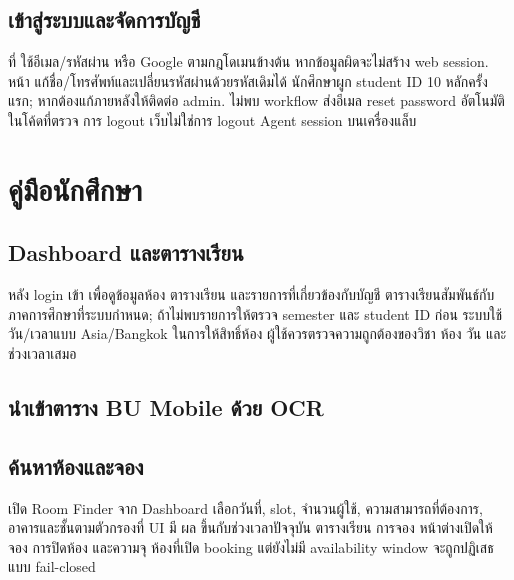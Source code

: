 \section*{เข้าสู่ระบบและจัดการบัญชี}
ที่  ใช้อีเมล/รหัสผ่าน หรือ Google ตามกฎโดเมนข้างต้น หากข้อมูลผิดจะไม่สร้าง web session. หน้า  แก้ชื่อ/โทรศัพท์และเปลี่ยนรหัสผ่านด้วยรหัสเดิมได้ นักศึกษาผูก student ID 10 หลักครั้งแรก; หากต้องแก้ภายหลังให้ติดต่อ admin. ไม่พบ workflow ส่งอีเมล reset password อัตโนมัติในโค้ดที่ตรวจ การ logout เว็บไม่ใช่การ logout Agent session บนเครื่องแล็บ

\chapter{คู่มือนักศึกษา}
\section*{Dashboard และตารางเรียน}
หลัง login เข้า  เพื่อดูข้อมูลห้อง ตารางเรียน และรายการที่เกี่ยวข้องกับบัญชี ตารางเรียนสัมพันธ์กับภาคการศึกษาที่ระบบกำหนด; ถ้าไม่พบรายการให้ตรวจ semester และ student ID ก่อน ระบบใช้วัน/เวลาแบบ Asia/Bangkok ในการให้สิทธิ์ห้อง ผู้ใช้ควรตรวจความถูกต้องของวิชา ห้อง วัน และช่วงเวลาเสมอ
\section*{นำเข้าตาราง BU Mobile ด้วย OCR}
\begin{enumerate}
\end{enumerate}
\section*{ค้นหาห้องและจอง}
เปิด Room Finder จาก Dashboard เลือกวันที่, slot, จำนวนผู้ใช้, ความสามารถที่ต้องการ, อาคารและชั้นตามตัวกรองที่ UI มี ผล  ขึ้นกับช่วงเวลาปัจจุบัน ตารางเรียน การจอง หน้าต่างเปิดให้จอง การปิดห้อง และความจุ ห้องที่เปิด booking แต่ยังไม่มี availability window จะถูกปฏิเสธแบบ fail-closed

